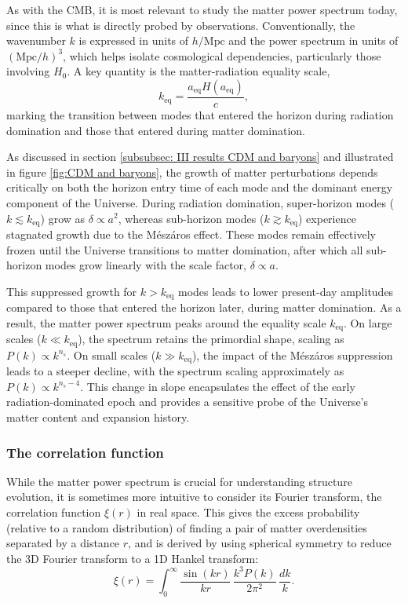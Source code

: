 \documentclass{aa}
\numberwithin{equation}{section}
\numberwithin{table}{section}
\numberwithin{figure}{section}
\begin{document}
As with the CMB, it is most relevant to study the matter power spectrum today, since this is what is directly probed by observations. Conventionally, the wavenumber $k$ is expressed in units of $h/\text{Mpc}$ and the power spectrum in units of $(\text{Mpc}/h)^3$, which helps isolate cosmological dependencies, particularly those involving $H_0$. A key quantity is the matter-radiation equality scale,
\begin{equation}
k_\text{eq} = \frac{a_\text{eq} H(a_\text{eq})}{c},
\end{equation}
marking the transition between modes that entered the horizon during radiation domination and those that entered during matter domination.

As discussed in section \ref{subsubsec: III results CDM and baryons} and illustrated in figure \ref{fig:CDM and baryons}, the growth of matter perturbations depends critically on both the horizon entry time of each mode and the dominant energy component of the Universe. During radiation domination, super-horizon modes ($k \lesssim k_\text{eq}$) grow as $\delta \propto a^2$, whereas sub-horizon modes ($k \gtrsim k_\text{eq}$) experience stagnated growth due to the Mészáros effect. These modes remain effectively frozen until the Universe transitions to matter domination, after which all sub-horizon modes grow linearly with the scale factor, $\delta \propto a$.

This suppressed growth for $k > k_\text{eq}$ modes leads to lower present-day amplitudes compared to those that entered the horizon later, during matter domination. As a result, the matter power spectrum peaks around the equality scale $k_\text{eq}$. On large scales ($k \ll k_\text{eq}$), the spectrum retains the primordial shape, scaling as $P(k) \propto k^{n_s}$. On small scales ($k \gg k_\text{eq}$), the impact of the Mészáros suppression leads to a steeper decline, with the spectrum scaling approximately as $P(k) \propto k^{n_s - 4}$. This change in slope encapsulates the effect of the early radiation-dominated epoch and provides a sensitive probe of the Universe's matter content and expansion history.



\subsubsection{The correlation function}\label{subsubsec: IV theory correlation}
While the matter power spectrum is crucial for understanding structure evolution, it is sometimes more intuitive to consider its Fourier transform, the correlation function $\xi(r)$ in real space. This gives the excess probability (relative to a random distribution) of finding a pair of matter overdensities separated by a distance $r$, and is derived by using spherical symmetry to reduce the 3D Fourier transform to a 1D Hankel transform:
\begin{equation}
\xi(r) = \int_0^\infty \frac{\sin(kr)}{kr} \, \frac{k^3 P(k)}{2\pi^2} \, \frac{dk}{k}. \label{eq: correlation}
\end{equation}
\end{document}
